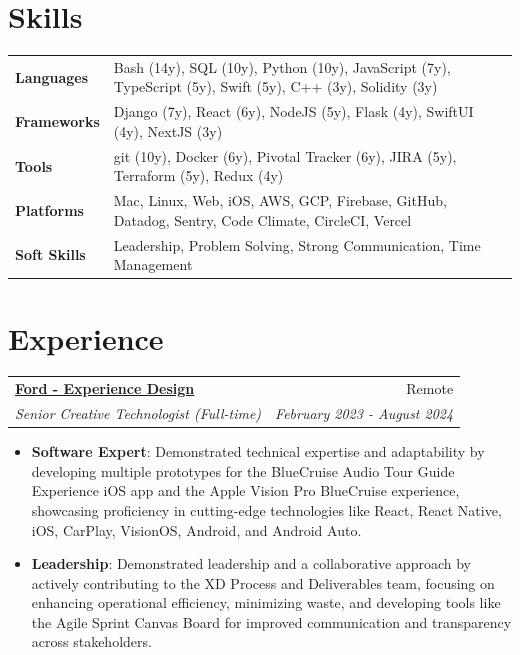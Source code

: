 \documentclass[a4paper,20pt]{article}
\makeatletter
\newcommand{\resumeItem}[2]{
  \item\small{
    \textbf{#1}{: #2 \vspace{-6pt}}
  }
}
\newcommand{\resumeSubheading}[4]{
  \vspace{-1pt}\item
    \begin{tabular*}{0.97\textwidth}{l@{\extracolsep{\fill}}r}
      \textbf{#1} & #2 \\
      \textit{#3} & \textit{#4} \\
    \end{tabular*}\vspace{-5pt}
}
\newcommand{\resumeItemListStart}{\begin{itemize}}
\newcommand{\resumeItemListEnd}{\end{itemize}\vspace{-3pt}}
\makeatother
\begin{document}
{\color{BurntOrange} \section{\textbf{Skills}}}
\begin{tabular}{p{3cm} p{24cm}}
\hspace{0.5cm}\textbf{Languages} & Bash (14y), SQL (10y), Python (10y), JavaScript (7y), TypeScript (5y), Swift (5y), C++ (3y), Solidity (3y) \\
\hspace{0.5cm}\textbf{Frameworks} & Django (7y), React (6y), NodeJS (5y), Flask (4y), SwiftUI (4y), NextJS (3y) \\
\hspace{0.5cm}\textbf{Tools} & git (10y), Docker (6y), Pivotal Tracker (6y), JIRA (5y), Terraform (5y), Redux (4y) \\
\hspace{0.5cm}\textbf{Platforms} & Mac, Linux, Web, iOS, AWS, GCP, Firebase, GitHub, Datadog, Sentry, Code Climate, CircleCI, Vercel \\
\hspace{0.5cm}\textbf{Soft Skills} & Leadership, Problem Solving, Strong Communication, Time Management \\
\end{tabular}
\vspace{8pt}

{\color{ForestGreen} \section{\textbf{Experience}}}

  \resumeSubHeadingListStart

  \resumeSubheading{\underline{\href{http://ford.com}{Ford - Experience Design}}}{Remote}
    {Senior Creative Technologist (Full-time)}{February 2023 - August 2024}
    \resumeItemListStart
          \resumeItem{Software Expert}
          {Demonstrated technical expertise and adaptability by developing multiple prototypes for the BlueCruise Audio Tour Guide Experience iOS app and the Apple Vision Pro BlueCruise experience, showcasing proficiency in cutting-edge technologies like React, React Native, iOS, CarPlay, VisionOS, Android, and Android Auto.}
          \resumeItem{Leadership}
          {Demonstrated leadership and a collaborative approach by actively contributing to the XD Process and Deliverables team, focusing on enhancing operational efficiency, minimizing waste, and developing tools like the Agile Sprint Canvas Board for improved communication and transparency across stakeholders.}
          \resumeItemListEnd
\end{document}
